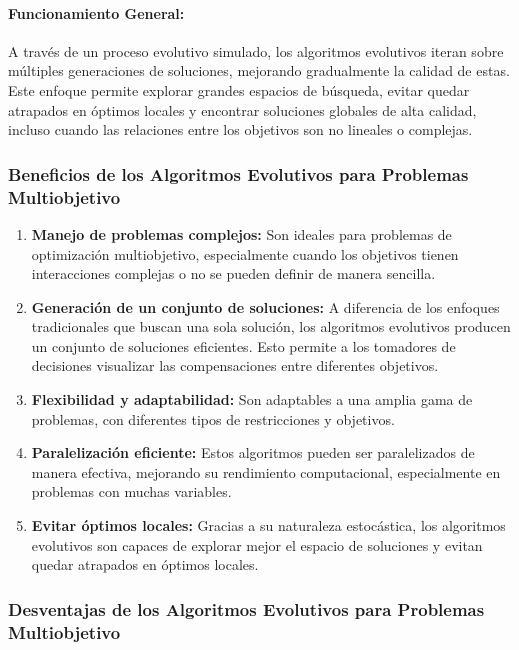 \documentclass[12pt]{article}
\begin{document}
\paragraph{Funcionamiento General:}
A través de un proceso evolutivo simulado, los algoritmos evolutivos iteran sobre múltiples generaciones de soluciones, mejorando gradualmente la calidad de estas. Este enfoque permite explorar grandes espacios de búsqueda, evitar quedar atrapados en óptimos locales y encontrar soluciones globales de alta calidad, incluso cuando las relaciones entre los objetivos son no lineales o complejas.

\subsubsection{Beneficios de los Algoritmos Evolutivos para Problemas Multiobjetivo}

\begin{enumerate}
    \item \textbf{Manejo de problemas complejos:} Son ideales para problemas de optimización multiobjetivo, especialmente cuando los objetivos tienen interacciones complejas o no se pueden definir de manera sencilla.
    \item \textbf{Generación de un conjunto de soluciones:} A diferencia de los enfoques tradicionales que buscan una sola solución, los algoritmos evolutivos producen un conjunto de soluciones eficientes. Esto permite a los tomadores de decisiones visualizar las compensaciones entre diferentes objetivos.
    \item \textbf{Flexibilidad y adaptabilidad:} Son adaptables a una amplia gama de problemas, con diferentes tipos de restricciones y objetivos.
    \item \textbf{Paralelización eficiente:} Estos algoritmos pueden ser paralelizados de manera efectiva, mejorando su rendimiento computacional, especialmente en problemas con muchas variables.
    \item \textbf{Evitar óptimos locales:} Gracias a su naturaleza estocástica, los algoritmos evolutivos son capaces de explorar mejor el espacio de soluciones y evitan quedar atrapados en óptimos locales.
\end{enumerate}

\subsubsection{Desventajas de los Algoritmos Evolutivos para Problemas Multiobjetivo}
\end{document}
